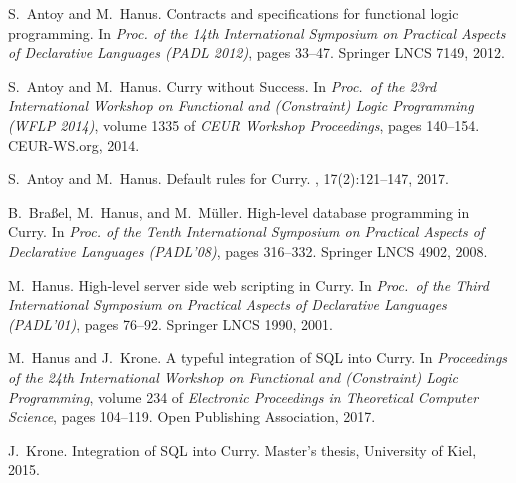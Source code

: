 \documentclass[11pt,fleqn]{article}
\begin{document}
\sloppy

\newcommand{\curryppdocs}{.}

\clearpage
\appendix


\begin{thebibliography}{10}

S.~Antoy and M.~Hanus.
\newblock Contracts and specifications for functional logic programming.
\newblock In {\em Proc. of the 14th International Symposium on Practical
  Aspects of Declarative Languages (PADL 2012)}, pages 33--47. Springer LNCS
  7149, 2012.

S.~Antoy and M.~Hanus.
\newblock Curry without {Success}.
\newblock In {\em Proc.\ of the 23rd International Workshop on Functional and
  (Constraint) Logic Programming (WFLP 2014)}, volume 1335 of {\em {CEUR}
  Workshop Proceedings}, pages 140--154. CEUR-WS.org, 2014.

S.~Antoy and M.~Hanus.
\newblock Default rules for {Curry}.
, 17(2):121--147, 2017.

B.~Bra{\ss}el, M.~Hanus, and M.~M{\"u}ller.
\newblock High-level database programming in {Curry}.
\newblock In {\em Proc. of the Tenth International Symposium on Practical
  Aspects of Declarative Languages (PADL'08)}, pages 316--332. Springer LNCS
  4902, 2008.

M.~Hanus.
\newblock High-level server side web scripting in {C}urry.
\newblock In {\em Proc.\ of the Third International Symposium on Practical
  Aspects of Declarative Languages (PADL'01)}, pages 76--92. Springer LNCS
  1990, 2001.

M.~Hanus and J.~Krone.
\newblock A typeful integration of {SQL} into {Curry}.
\newblock In {\em Proceedings of the 24th International Workshop on Functional
  and (Constraint) Logic Programming}, volume 234 of {\em Electronic
  Proceedings in Theoretical Computer Science}, pages 104--119. Open Publishing
  Association, 2017.

J.~Krone.
\newblock Integration of {SQL} into {Curry}.
\newblock Master's thesis, University of Kiel, 2015.

\end{thebibliography}
\end{document}
